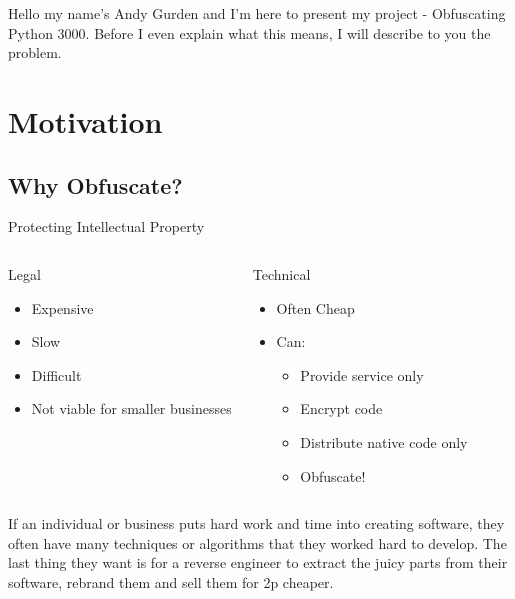 Hello my name's Andy Gurden and I'm here to present my project - Obfuscating Python 3000. Before I even explain what this means,
I will describe to you the problem.

\section{Motivation}

\subsection{Why Obfuscate?}

\begin{frame}{Protecting Intellectual Property}
\begin{columns}[t]
  \begin{block}{Legal}
  \begin{itemize}
  \item Expensive
  \item Slow
  \item Difficult
  \item Not viable for smaller businesses
  \end{itemize}
  \end{block}

\pause

  \begin{block}{Technical}
  \begin{itemize}
  \item Often Cheap
  \item Can:
  \begin{itemize}
  \item Provide service only
  \item Encrypt code
  \item Distribute native code only
  \item<3> Obfuscate!
  \end{itemize}
  \end{itemize}
  \end{block}
\end{columns}
\end{frame}

If an individual or business puts hard work and time into creating software, they often have many techniques or algorithms that they worked hard to
develop. The last thing they want is for a reverse engineer to extract the juicy parts from their software, rebrand them and sell them for 2p cheaper.

